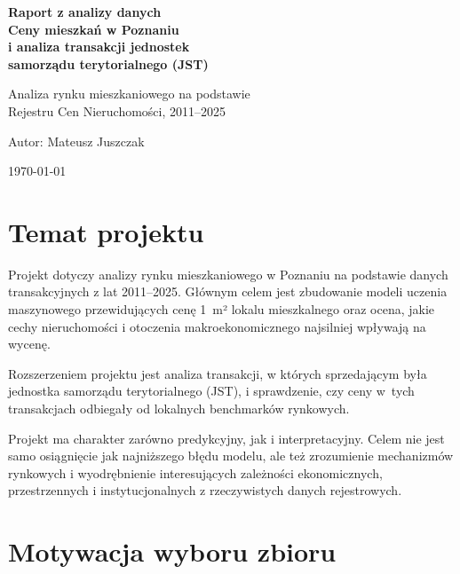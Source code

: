 \documentclass[12pt,a4paper]{article}
\begin{document}
\begin{titlepage}
  \centering
  \vspace*{2cm}
  {\LARGE\bfseries Raport z analizy danych\\[0.4em]
  Ceny mieszkań w Poznaniu\\[0.3em]
  i analiza transakcji jednostek\\[0.3em]
  samorządu terytorialnego (JST)\par}
  \vspace{1.5cm}
  
  {\large Analiza rynku mieszkaniowego na podstawie\\
  Rejestru Cen Nieruchomości, 2011--2025\par}
  \vspace{2cm}
  
  {\large Autor: Mateusz Juszczak\par}


  \vfill
  {\normalsize \today}
\end{titlepage}

\tableofcontents
\newpage

\section{Temat projektu}

Projekt dotyczy analizy rynku mieszkaniowego w Poznaniu na podstawie danych transakcyjnych z lat 2011--2025.
Głównym celem jest zbudowanie modeli uczenia maszynowego przewidujących cenę 1~m² lokalu mieszkalnego oraz ocena, jakie cechy nieruchomości i otoczenia makroekonomicznego najsilniej wpływają na wycenę.

Rozszerzeniem projektu jest analiza transakcji, w których sprzedającym była jednostka samorządu terytorialnego (JST), i sprawdzenie, czy ceny w~tych transakcjach odbiegały od lokalnych benchmarków rynkowych.

Projekt ma charakter zarówno predykcyjny, jak i interpretacyjny. Celem nie jest samo osiągnięcie jak najniższego błędu modelu, ale też zrozumienie mechanizmów rynkowych i wyodrębnienie interesujących zależności ekonomicznych, przestrzennych i instytucjonalnych z rzeczywistych danych rejestrowych.

\section{Motywacja wyboru zbioru}
\end{document}
